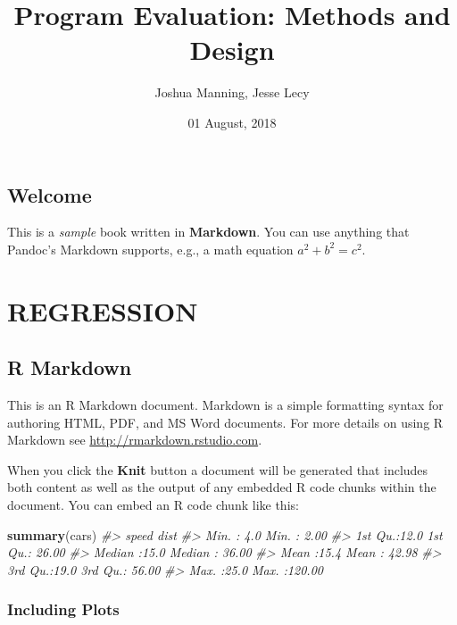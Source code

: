 \documentclass[]{book}
\title{Program Evaluation: Methods and Design}
\author{Joshua Manning, Jesse Lecy}
\date{01 August, 2018}
\newenvironment{Shaded}{\begin{snugshade}}{\end{snugshade}}
\newcommand{\CommentTok}[1]{\textcolor[rgb]{0.56,0.35,0.01}{\textit{#1}}}
\newcommand{\KeywordTok}[1]{\textcolor[rgb]{0.13,0.29,0.53}{\textbf{#1}}}
\newcommand{\NormalTok}[1]{#1}
\theoremstyle{definition}
\theoremstyle{definition}
\theoremstyle{definition}
\theoremstyle{remark}
\begin{document}
\maketitle

{
\setcounter{tocdepth}{1}
\tableofcontents
}
\hypertarget{welcome}{%
\chapter*{Welcome}\label{welcome}}

This is a \emph{sample} book written in \textbf{Markdown}. You can use
anything that Pandoc's Markdown supports, e.g., a math equation
\(a^2 + b^2 = c^2\).

\hypertarget{part-regression}{%
\part{REGRESSION}\label{part-regression}}

\hypertarget{r-markdown}{%
\chapter{R Markdown}\label{r-markdown}}

This is an R Markdown document. Markdown is a simple formatting syntax
for authoring HTML, PDF, and MS Word documents. For more details on
using R Markdown see \url{http://rmarkdown.rstudio.com}.

When you click the \textbf{Knit} button a document will be generated
that includes both content as well as the output of any embedded R code
chunks within the document. You can embed an R code chunk like this:

\begin{Shaded}
\begin{Highlighting}[]
\KeywordTok{summary}\NormalTok{(cars)}
\CommentTok{#>      speed           dist       }
\CommentTok{#>  Min.   : 4.0   Min.   :  2.00  }
\CommentTok{#>  1st Qu.:12.0   1st Qu.: 26.00  }
\CommentTok{#>  Median :15.0   Median : 36.00  }
\CommentTok{#>  Mean   :15.4   Mean   : 42.98  }
\CommentTok{#>  3rd Qu.:19.0   3rd Qu.: 56.00  }
\CommentTok{#>  Max.   :25.0   Max.   :120.00}
\end{Highlighting}
\end{Shaded}

\hypertarget{including-plots}{%
\section{Including Plots}\label{including-plots}}
\end{document}
